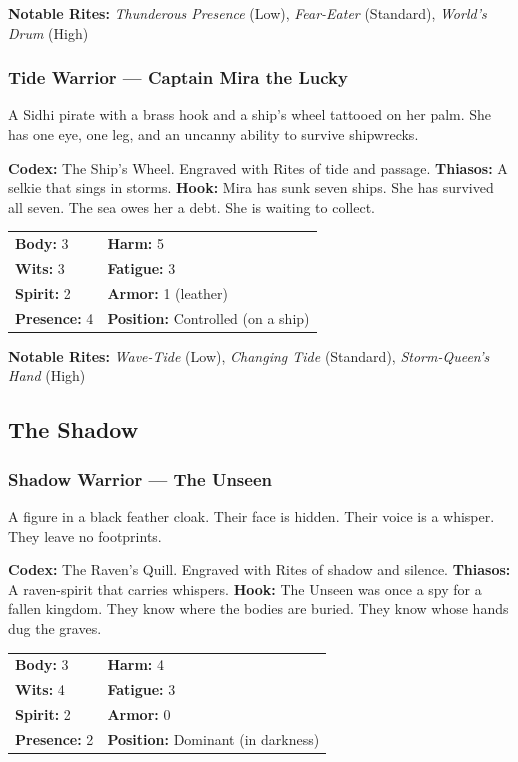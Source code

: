 \textbf{Notable Rites:} \textit{Thunderous Presence} (Low), \textit{Fear-Eater} (Standard), \textit{World's Drum} (High)

\subsubsection{Tide Warrior — Captain Mira the Lucky}

A Sidhi pirate with a brass hook and a ship's wheel tattooed on her palm. She has one eye, one leg, and an uncanny ability to survive shipwrecks.

\textbf{Codex:} The Ship's Wheel. Engraved with Rites of tide and passage.
\textbf{Thiasos:} A selkie that sings in storms.
\textbf{Hook:} Mira has sunk seven ships. She has survived all seven. The sea owes her a debt. She is waiting to collect.

\begin{tabular}{ll}
\textbf{Body:} 3 & \textbf{Harm:} 5 \\
\textbf{Wits:} 3 & \textbf{Fatigue:} 3 \\
\textbf{Spirit:} 2 & \textbf{Armor:} 1 (leather) \\
\textbf{Presence:} 4 & \textbf{Position:} Controlled (on a ship) \\
\end{tabular}

\textbf{Notable Rites:} \textit{Wave-Tide} (Low), \textit{Changing Tide} (Standard), \textit{Storm-Queen's Hand} (High)

\subsection{The Shadow}

\subsubsection{Shadow Warrior — The Unseen}

A figure in a black feather cloak. Their face is hidden. Their voice is a whisper. They leave no footprints.

\textbf{Codex:} The Raven's Quill. Engraved with Rites of shadow and silence.
\textbf{Thiasos:} A raven-spirit that carries whispers.
\textbf{Hook:} The Unseen was once a spy for a fallen kingdom. They know where the bodies are buried. They know whose hands dug the graves.

\begin{tabular}{ll}
\textbf{Body:} 3 & \textbf{Harm:} 4 \\
\textbf{Wits:} 4 & \textbf{Fatigue:} 3 \\
\textbf{Spirit:} 2 & \textbf{Armor:} 0 \\
\textbf{Presence:} 2 & \textbf{Position:} Dominant (in darkness) \\
\end{tabular}

